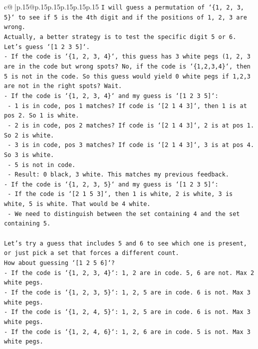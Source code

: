 \documentclass{article}
\begin{document}
{\begin{supertabular}{c@{$\;$}|p{.15\linewidth}@{}p{.15\linewidth}p{.15\linewidth}p{.15\linewidth}p{.15\linewidth}p{.15\linewidth}}
{{{\texttt{I will guess a permutation of `\{1, 2, 3, 5\}` to see if 5 is the 4th digit and if the positions of 1, 2, 3 are wrong.} \\
\texttt{Actually, a better strategy is to test the specific digit 5 or 6.} \\
\texttt{Let's guess `{[}1 2 3 5{]}`.} \\
\texttt{{-} If the code is `\{1, 2, 3, 4\}`, this guess has 3 white pegs (1, 2, 3 are in the code but wrong spots? No, if the code is `\{1,2,3,4\}`, then 5 is not in the code. So this guess would yield 0 white pegs if 1,2,3 are not in the right spots? Wait.} \\
\texttt{{-} If the code is `\{1, 2, 3, 4\}` and my guess is `{[}1 2 3 5{]}`:} \\
\texttt{  {-} 1 is in code, pos 1 matches? If code is `{[}2 1 4 3{]}`, then 1 is at pos 2. So 1 is white.} \\
\texttt{  {-} 2 is in code, pos 2 matches? If code is `{[}2 1 4 3{]}`, 2 is at pos 1. So 2 is white.} \\
\texttt{  {-} 3 is in code, pos 3 matches? If code is `{[}2 1 4 3{]}`, 3 is at pos 4. So 3 is white.} \\
\texttt{  {-} 5 is not in code.} \\
\texttt{  {-} Result: 0 black, 3 white. This matches my previous feedback.} \\
\texttt{{-} If the code is `\{1, 2, 3, 5\}` and my guess is `{[}1 2 3 5{]}`:} \\
\texttt{  {-} If the code is `{[}2 1 5 3{]}`, then 1 is white, 2 is white, 3 is white, 5 is white. That would be 4 white.} \\
\texttt{  {-} We need to distinguish between the set containing 4 and the set containing 5.} \\
\\ 
\texttt{Let's try a guess that includes 5 and 6 to see which one is present, or just pick a set that forces a different count.} \\
\texttt{How about guessing `{[}1 2 5 6{]}`?} \\
\texttt{{-} If the code is `\{1, 2, 3, 4\}`: 1, 2 are in code. 5, 6 are not. Max 2 white pegs.} \\
\texttt{{-} If the code is `\{1, 2, 3, 5\}`: 1, 2, 5 are in code. 6 is not. Max 3 white pegs.} \\
\texttt{{-} If the code is `\{1, 2, 4, 5\}`: 1, 2, 5 are in code. 6 is not. Max 3 white pegs.} \\
\texttt{{-} If the code is `\{1, 2, 4, 6\}`: 1, 2, 6 are in code. 5 is not. Max 3 white pegs.} \\
}}}
\end{supertabular}}
\end{document}
